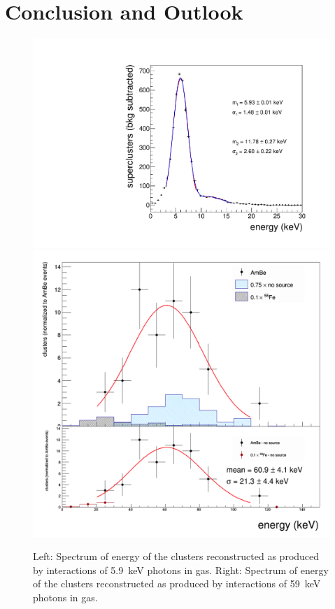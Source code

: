 \documentclass[12pt]{iopart}
\begin{document}
 
 \section{Conclusion and Outlook}
 
 


\begin{figure}[ht]
	\centering
	\includegraphics[width=0.45\linewidth]{fe_diff_simplefit.pdf}
	\includegraphics[width=0.45\linewidth]{spectrum_59keV.png}
  	\caption{Left: Spectrum of energy of the clusters reconstructed as produced by interactions of 5.9~keV photons in gas. Right: Spectrum of energy of the clusters reconstructed as produced by interactions of 59~keV photons in gas.}
  	\label{fig:55Fe&59keV}
\end{figure}
\end{document}
